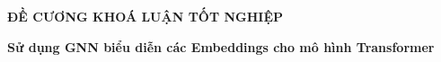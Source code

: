 \documentclass{article}[14pt]
\begin{document}
    \begin{figure}[h]
        \begin{floatrow}
        {%
    
        }
        {%
    
        }
        \end{floatrow}
    \end{figure}
    
    \begin{center}
        
        \textbf{\Large ĐỀ CƯƠNG KHOÁ LUẬN TỐT NGHIỆP} \\ 
    \end{center}
    
    
    \begin{center}
        
        \textbf{\huge Sử dụng GNN biểu diễn các Embeddings cho mô hình Transformer} 
        \\
        
    \end{center}
    
\end{document}

